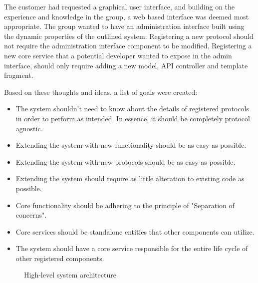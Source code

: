The customer had requested a graphical user interface, and building on the experience and knowledge in the group, a web based interface was deemed most appropriate. The group wanted to have an administration interface built using the dynamic properties of the outlined system. Registering a new protocol should not require the administration interface component to be modified. Registering a new core service that a potential developer wanted to expose in the admin interface, should only require adding a new model, API controller and template fragment.

Based on these thoughts and ideas, a list of goals were created:

\begin{itemize}
\item The system shouldn't need to know about the details of registered protocols in order to perform as intended. In essence, it should be completely protocol agnostic.
\item Extending the system with new functionality should be as easy as possible.
\item Extending the system with new protocols should be as easy as possible.
\item Extending the system should require as little alteration to existing code as possible.
\item Core functionality should be adhering to the principle of "Separation of concerns".
\item Core services should be standalone entities that other components can utilize.
\item The system should have a core service responsible for the entire life cycle of other registered components.
\end{itemize}

\begin{center}
  \begin{figure}[ht!]
    \caption{High-level system architecture}
    \label{fig:abstract_architecture}
  \end{figure}
\end{center}

